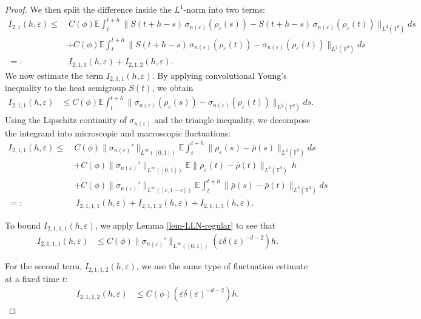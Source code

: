 \documentclass[UTF-8,reqno]{amsart}
\numberwithin{equation}{section}
\def\leq{\leqslant}
\def\leq{\leqslant}
\begin{document}
\begin{proof}
We then split the difference inside the $L^1$-norm into two terms:
\begin{align*}
I_{2,1}(h,\varepsilon) 
\leq&\ C(\phi) \mathbb{E} \int_t^{t+h} \| S(t+h - s)\, \sigma_{n(\varepsilon)}(\rho_{\varepsilon}(s)) 
- S(t+h - s)\, \sigma_{n(\varepsilon)}(\rho_{\varepsilon}(t)) \|_{L^2(\mathbb{T}^d)} ds \\
&+ C(\phi) \mathbb{E} \int_t^{t+h} \| S(t+h - s)\, \sigma_{n(\varepsilon)}(\rho_{\varepsilon}(t)) 
- \sigma_{n(\varepsilon)}(\rho_{\varepsilon}(t)) \|_{L^2(\mathbb{T}^d)} ds \\
=:&\ I_{2,1,1}(h,\varepsilon) + I_{2,1,2}(h,\varepsilon).
\end{align*}
We now estimate the term $I_{2,1,1}(h,\varepsilon)$. By applying convolutional Young's inequality to the heat semigroup $S(t)$, we obtain
\begin{align*}
I_{2,1,1}(h,\varepsilon) 
&\leq C(\phi) \mathbb{E} \int_t^{t+h} \| \sigma_{n(\varepsilon)}(\rho_{\varepsilon}(s)) - \sigma_{n(\varepsilon)}(\rho_{\varepsilon}(t)) \|_{L^2(\mathbb{T}^d)} ds.
\end{align*}
Using the Lipschitz continuity of $\sigma_{n(\varepsilon)}$ and the triangle inequality, we decompose the integrand into microscopic and macroscopic fluctuations:
\begin{align*}
I_{2,1,1}(h,\varepsilon) 
\leq\ & C(\phi) \| \sigma_{n(\varepsilon)}' \|_{L^{\infty}([0,1])} \mathbb{E} \int_t^{t+h} \| \rho_{\varepsilon}(s) - \bar{\rho}(s) \|_{L^2(\mathbb{T}^d)} ds \\
& + C(\phi) \| \sigma_{n(\varepsilon)}' \|_{L^{\infty}([0,1])} \mathbb{E} \| \rho_{\varepsilon}(t) - \bar{\rho}(t) \|_{L^2(\mathbb{T}^d)}\, h \\
& + C(\phi) \| \sigma_{n(\varepsilon)}' \|_{L^{\infty}([c,1-c])} \mathbb{E} \int_t^{t+h} \| \bar{\rho}(s) - \bar{\rho}(t) \|_{L^2(\mathbb{T}^d)} ds \\
=:&\ I_{2,1,1,1}(h,\varepsilon) + I_{2,1,1,2}(h,\varepsilon) + I_{2,1,1,3}(h,\varepsilon).
\end{align*}

To bound $I_{2,1,1,1}(h,\varepsilon)$, we apply Lemma \ref{lem-LLN-regular} to see that 
\begin{align*}
I_{2,1,1,1}(h,\varepsilon) 
&\leq C(\phi) \| \sigma_{n(\varepsilon)}' \|_{L^{\infty}([0,1])} 
\left( \varepsilon \delta(\varepsilon)^{-d-2} \right) h.
\end{align*}

For the second term, $I_{2,1,1,2}(h,\varepsilon)$, we use the same type of fluctuation estimate at a fixed time $t$:
\begin{align*}
I_{2,1,1,2}(h,\varepsilon) 
&\leq C(\phi) \left( \varepsilon \delta(\varepsilon)^{-d-2} \right) h.
\end{align*}


\end{proof}
\end{document}

